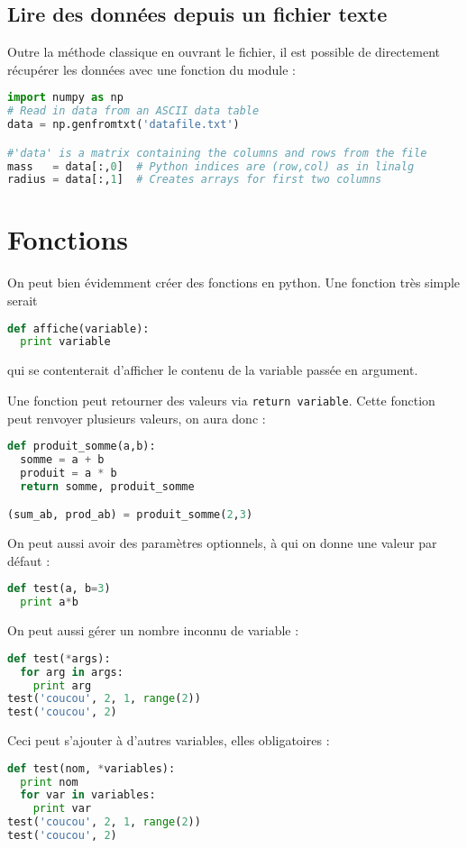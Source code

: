 \documentclass[a4paper,twoside]{article}
\begin{document}
\subsection{Lire des données depuis un fichier texte}
Outre la méthode classique en ouvrant le fichier, il est possible de directement récupérer les données avec une fonction du module  : 
\begin{lstlisting}[language=python]
import numpy as np
# Read in data from an ASCII data table
data = np.genfromtxt('datafile.txt')

#'data' is a matrix containing the columns and rows from the file
mass   = data[:,0]  # Python indices are (row,col) as in linalg
radius = data[:,1]  # Creates arrays for first two columns
\end{lstlisting}

\section{Fonctions}
On peut bien évidemment créer des fonctions en python. Une fonction très simple serait
\begin{lstlisting}[language=python]
def affiche(variable):
  print variable
\end{lstlisting}
qui se contenterait d'afficher le contenu de la variable passée en argument.

Une fonction peut retourner des valeurs via \verb|return variable|. Cette fonction peut renvoyer plusieurs valeurs, on aura donc :
\begin{lstlisting}[language=python]
def produit_somme(a,b):
  somme = a + b
  produit = a * b
  return somme, produit_somme

(sum_ab, prod_ab) = produit_somme(2,3)
\end{lstlisting}

On peut aussi avoir des paramètres optionnels, à qui on donne une valeur par défaut :
\begin{lstlisting}[language=python]
def test(a, b=3)
  print a*b
\end{lstlisting}

On peut aussi gérer un nombre inconnu de variable :
\begin{lstlisting}[language=python]
def test(*args):
  for arg in args:
    print arg
test('coucou', 2, 1, range(2))
test('coucou', 2)
\end{lstlisting}

Ceci peut s'ajouter à d'autres variables, elles obligatoires :
\begin{lstlisting}[language=python]
def test(nom, *variables):
  print nom
  for var in variables:
    print var
test('coucou', 2, 1, range(2))
test('coucou', 2)
\end{lstlisting}
\end{document}
